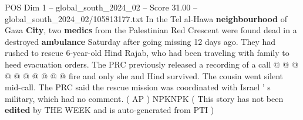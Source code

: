 \begin{textsample}{POS Dim 1 – global\_south\_2024\_02 – Score 31.00 – global\_south\_2024\_02/105813177.txt}
In the Tel al-Hawa \textbf{neighbourhood} of Gaza \textbf{City}, two \textbf{medics} from the Palestinian Red Crescent were found dead in a destroyed \textbf{ambulance} Saturday after going missing 12 days ago.
They had rushed to rescue 6-year-old Hind Rajab, who had been traveling with family to heed evacuation orders.
The PRC previously released a recording of a call @ @ @ @ @ @ @ @ @ @ fire and only she and Hind survived.
The cousin went silent mid-call.
The PRC said the rescue mission was coordinated with Israel ' s military, which had no comment. ( AP ) NPKNPK ( This story has not been \textbf{edited} by THE WEEK and is auto-generated from PTI )

\end{textsample}
